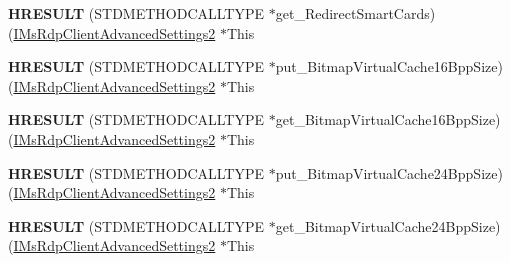 \begin{DoxyCompactItemize}
{\bfseries H\+R\+E\+S\+U\+LT} (S\+T\+D\+M\+E\+T\+H\+O\+D\+C\+A\+L\+L\+T\+Y\+PE $\ast$get\+\_\+\+Redirect\+Smart\+Cards)(\hyperlink{interface_m_s_t_s_c_lib_1_1_i_ms_rdp_client_advanced_settings2}{I\+Ms\+Rdp\+Client\+Advanced\+Settings2} $\ast$This
\item 
\mbox{\label{struct_m_s_t_s_c_lib_1_1_i_ms_rdp_client_advanced_settings2_vtbl_a3f4847aa4bd79fd33062e440604cf465}} 
{\bfseries H\+R\+E\+S\+U\+LT} (S\+T\+D\+M\+E\+T\+H\+O\+D\+C\+A\+L\+L\+T\+Y\+PE $\ast$put\+\_\+\+Bitmap\+Virtual\+Cache16\+Bpp\+Size)(\hyperlink{interface_m_s_t_s_c_lib_1_1_i_ms_rdp_client_advanced_settings2}{I\+Ms\+Rdp\+Client\+Advanced\+Settings2} $\ast$This
\item 
\mbox{\label{struct_m_s_t_s_c_lib_1_1_i_ms_rdp_client_advanced_settings2_vtbl_a338d7d330d561fee393cc6bbbf6f0d0c}} 
{\bfseries H\+R\+E\+S\+U\+LT} (S\+T\+D\+M\+E\+T\+H\+O\+D\+C\+A\+L\+L\+T\+Y\+PE $\ast$get\+\_\+\+Bitmap\+Virtual\+Cache16\+Bpp\+Size)(\hyperlink{interface_m_s_t_s_c_lib_1_1_i_ms_rdp_client_advanced_settings2}{I\+Ms\+Rdp\+Client\+Advanced\+Settings2} $\ast$This
\item 
\mbox{\label{struct_m_s_t_s_c_lib_1_1_i_ms_rdp_client_advanced_settings2_vtbl_a0c2ff9e5b864720f6298da1234ea8faa}} 
{\bfseries H\+R\+E\+S\+U\+LT} (S\+T\+D\+M\+E\+T\+H\+O\+D\+C\+A\+L\+L\+T\+Y\+PE $\ast$put\+\_\+\+Bitmap\+Virtual\+Cache24\+Bpp\+Size)(\hyperlink{interface_m_s_t_s_c_lib_1_1_i_ms_rdp_client_advanced_settings2}{I\+Ms\+Rdp\+Client\+Advanced\+Settings2} $\ast$This
\item 
\mbox{\label{struct_m_s_t_s_c_lib_1_1_i_ms_rdp_client_advanced_settings2_vtbl_ac9016f2950993593245df2727ad6ed79}} 
{\bfseries H\+R\+E\+S\+U\+LT} (S\+T\+D\+M\+E\+T\+H\+O\+D\+C\+A\+L\+L\+T\+Y\+PE $\ast$get\+\_\+\+Bitmap\+Virtual\+Cache24\+Bpp\+Size)(\hyperlink{interface_m_s_t_s_c_lib_1_1_i_ms_rdp_client_advanced_settings2}{I\+Ms\+Rdp\+Client\+Advanced\+Settings2} $\ast$This
\item 
\mbox{\label{struct_m_s_t_s_c_lib_1_1_i_ms_rdp_client_advanced_settings2_vtbl_adf903a9557727f2d6f8d6da553a09def}} 

\end{DoxyCompactItemize}
